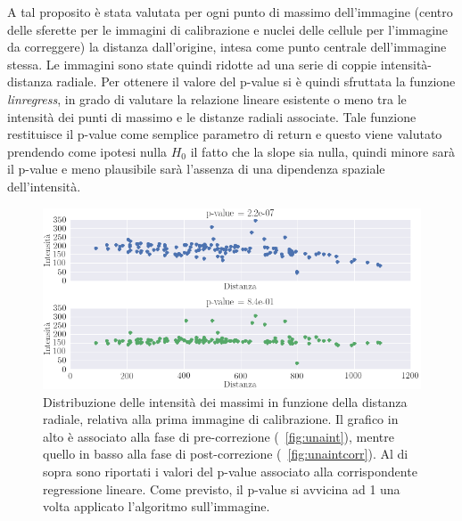 A tal proposito è stata valutata per ogni punto di massimo dell'immagine (centro delle sferette per le immagini di calibrazione e nuclei delle cellule per l'immagine da correggere) la distanza dall'origine, intesa come punto centrale dell'immagine stessa.
Le immagini sono state quindi ridotte ad una serie di coppie intensità-distanza radiale.
Per ottenere il valore del p-value si è quindi sfruttata la funzione \textit{linregress}, in grado di valutare la relazione lineare esistente o meno tra le intensità dei punti di massimo e le distanze radiali associate.
Tale funzione restituisce il p-value come semplice parametro di return e questo viene valutato prendendo come ipotesi nulla $H_0$ il fatto che la slope sia nulla, quindi minore sarà il p-value e meno plausibile sarà l'assenza di una dipendenza spaziale dell'intensità.

\begin{figure}
 \centering
 \includegraphics[scale=.55]{img/CAP4pvalue1.png}
 \caption{\small{Distribuzione delle intensità dei massimi in funzione della distanza radiale, relativa alla prima immagine di calibrazione. Il grafico in alto è associato alla fase di pre-correzione (\figurename~\ref{fig:unaint}), mentre quello in basso alla fase di post-correzione (\figurename~\ref{fig:unaintcorr}). Al di sopra sono riportati i valori del p-value associato alla corrispondente regressione lineare. Come previsto, il p-value si avvicina ad 1 una volta applicato l'algoritmo sull'immagine.}}
 \label{fig:pvalue1}
\end{figure}


